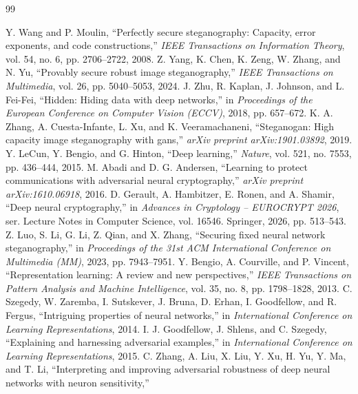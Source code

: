 \begin{thebibliography}{99}
Y. Wang and P. Moulin,
``Perfectly secure steganography: Capacity, error exponents, and code constructions,''
\emph{IEEE Transactions on Information Theory},
vol. 54, no. 6, pp. 2706--2722, 2008.
Z. Yang, K. Chen, K. Zeng, W. Zhang, and N. Yu,
``Provably secure robust image steganography,''
\emph{IEEE Transactions on Multimedia},
vol. 26, pp. 5040--5053, 2024.
J. Zhu, R. Kaplan, J. Johnson, and L. Fei-Fei,
``Hidden: Hiding data with deep networks,''
in \emph{Proceedings of the European Conference on Computer Vision (ECCV)},
2018, pp. 657--672.
K. A. Zhang, A. Cuesta-Infante, L. Xu, and K. Veeramachaneni,
``Steganogan: High capacity image steganography with gans,''
\emph{arXiv preprint arXiv:1901.03892}, 2019.
Y. LeCun, Y. Bengio, and G. Hinton,
``Deep learning,''
\emph{Nature}, vol. 521, no. 7553, pp. 436--444, 2015.
M. Abadi and D. G. Andersen,
``Learning to protect communications with adversarial neural cryptography,''
\emph{arXiv preprint arXiv:1610.06918}, 2016.
D. Gerault, A. Hambitzer, E. Ronen, and A. Shamir,
``Deep neural cryptography,''
in \emph{Advances in Cryptology -- EUROCRYPT 2026},
ser. Lecture Notes in Computer Science, vol. 16546.
Springer, 2026, pp. 513--543.
Z. Luo, S. Li, G. Li, Z. Qian, and X. Zhang,
``Securing fixed neural network steganography,''
in \emph{Proceedings of the 31st ACM International Conference on Multimedia (MM)},
2023, pp. 7943--7951.
Y. Bengio, A. Courville, and P. Vincent,
``Representation learning: A review and new perspectives,''
\emph{IEEE Transactions on Pattern Analysis and Machine Intelligence},
vol. 35, no. 8, pp. 1798--1828, 2013.
C. Szegedy, W. Zaremba, I. Sutskever, J. Bruna, D. Erhan,
I. Goodfellow, and R. Fergus,
``Intriguing properties of neural networks,''
in \emph{International Conference on Learning Representations}, 2014.
I. J. Goodfellow, J. Shlens, and C. Szegedy,
``Explaining and harnessing adversarial examples,''
in \emph{International Conference on Learning Representations}, 2015.
C. Zhang, A. Liu, X. Liu, Y. Xu, H. Yu, Y. Ma, and T. Li,
``Interpreting and improving adversarial robustness of deep neural networks with neuron sensitivity,''

\end{thebibliography}
